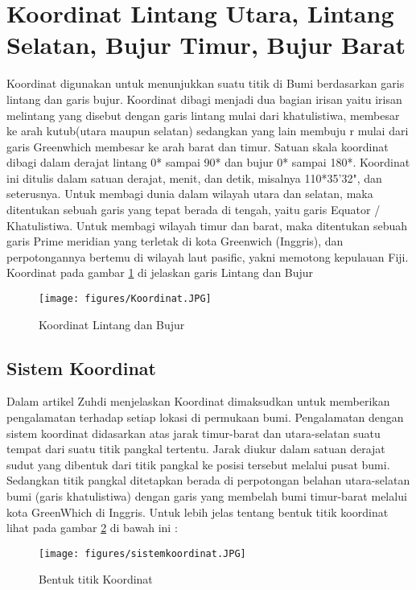 

\section{Koordinat Lintang Utara, Lintang Selatan, Bujur Timur, Bujur Barat}
Koordinat digunakan untuk menunjukkan suatu titik di Bumi berdasarkan garis lintang dan garis bujur. Koordinat dibagi menjadi dua bagian irisan yaitu irisan melintang yang disebut dengan garis lintang mulai dari khatulistiwa, membesar ke arah kutub(utara maupun selatan) sedangkan yang lain membuju r mulai dari garis Greenwhich membesar ke arah barat dan timur. Satuan skala koordinat dibagi dalam derajat lintang 0* sampai 90* dan bujur 0* sampai 180*. Koordinat ini ditulis dalam satuan derajat, menit, dan detik, misalnya 110*35'32", dan seterusnya. Untuk membagi dunia dalam wilayah utara dan selatan, maka ditentukan sebuah garis yang tepat berada di tengah, yaitu garis Equator / Khatulistiwa. Untuk membagi wilayah timur dan barat, maka ditentukan sebuah garis Prime meridian yang terletak di kota Greenwich (Inggris), dan perpotongannya bertemu di wilayah laut pasific, yakni memotong kepulauan Fiji.
Koordinat pada gambar \ref{Koordinat} di jelaskan garis Lintang dan Bujur
\begin{figure}[ht]
	\centerline{\texttt{[image: figures/Koordinat.JPG]}}
	\caption{Koordinat Lintang dan Bujur}
	\label{Koordinat}
	\end{figure}

\subsection{Sistem Koordinat}
Dalam artikel Zuhdi menjelaskan Koordinat dimaksudkan untuk memberikan pengalamatan terhadap setiap lokasi di permukaan bumi. Pengalamatan dengan sistem koordinat didasarkan atas jarak timur-barat dan utara-selatan suatu tempat dari suatu titik pangkal tertentu. Jarak diukur dalam satuan derajat sudut yang dibentuk dari titik pangkal ke posisi tersebut melalui pusat bumi. Sedangkan titik pangkal ditetapkan berada di perpotongan belahan utara-selatan bumi (garis khatulistiwa) dengan garis yang membelah bumi timur-barat melalui kota GreenWhich di Inggris. 
Untuk lebih jelas tentang bentuk titik koordinat lihat pada gambar \ref{sistemkoordinat} di bawah ini :
\begin{figure}[ht]
	\centerline{\texttt{[image: figures/sistemkoordinat.JPG]}}
	\caption{Bentuk titik Koordinat}
	\label{sistemkoordinat}
	\end{figure}

